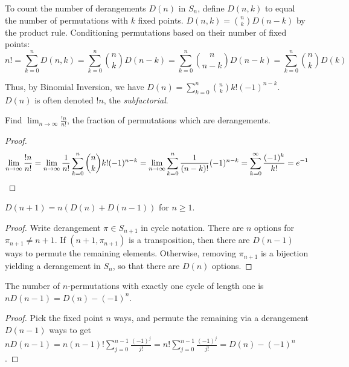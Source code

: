 \documentclass[a4paper]{article}
\begin{document}
\begin{theorem}\label{derangements}
To count the number of derangements $D(n)$ in $S_n$, define $D(n,k)$ to equal the number of permutations with $k$ fixed points. $D(n,k)=\binom nkD(n-k)$ by the product rule. Conditioning permutations based on their number of fixed points:
\begin{equation*}
n!
=\sum_{k=0}^nD(n,k)
=\sum_{k=0}^n\binom nkD(n-k)
=\sum_{k=0}^n\binom n{n-k}D(n-k)
=\sum_{k=0}^n\binom nkD(k)
\end{equation*}

Thus, by Binomial Inversion, we have $D(n)=\sum_{k=0}^n\binom nkk!(-1)^{n-k}$. $D(n)$ is often denoted $!n$, the \emph{subfactorial}.
\end{theorem}

\begin{corollary}
Find $\lim_{n\rightarrow\infty}\frac{!n}{n!}$, the fraction of permutations which are derangements.

\begin{hl}
\begin{proof}
\begin{equation*}
\lim_{n\rightarrow\infty}\frac{!n}{n!}
=\lim_{n\rightarrow\infty}\frac1{n!}\sum_{k=0}^n\binom nkk!(-1)^{n-k}
=\lim_{n\rightarrow\infty}\sum_{k=0}^n\frac1{(n-k)!}(-1)^{n-k}
=\sum_{k=0}^{\infty}\frac{(-1)^{k}}{k!}
=e^{-1}\qedhere
\end{equation*}
\end{proof}
\end{hl}
\end{corollary}

\begin{lemma}
$D(n+1)=n(D(n)+D(n-1))$ for $n\geq1$.

\begin{hl}
\begin{proof}
Write derangement $\pi\in S_{n+1}$ in cycle notation. There are $n$ options for $\pi_{n+1}\neq n+1$. If $(n+1,\pi_{n+1})$ is a transposition, then there are $D(n-1)$ ways to permute the remaining elements. Otherwise, removing $\pi_{n+1}$ is a bijection yielding a derangement in $S_n$, so that there are $D(n)$ options.
\end{proof}
\end{hl}
\end{lemma}

\begin{lemma}\label{one_fixed_point}
The number of $n$-permutations with exactly one cycle of length one is $nD(n-1)=D(n)-(-1)^n$.

\begin{hl}
\begin{proof}
Pick the fixed point $n$ ways, and permute the remaining via a derangement $D(n-1)$ ways to get $nD(n-1)=n(n-1)!\sum_{j=0}^{n-1}\frac{(-1)^j}{j!}=n!\sum_{j=0}^{n-1}\frac{(-1)^j}{j!}=D(n)-(-1)^n$.
\end{proof}
\end{hl}
\end{lemma}
\end{document}
